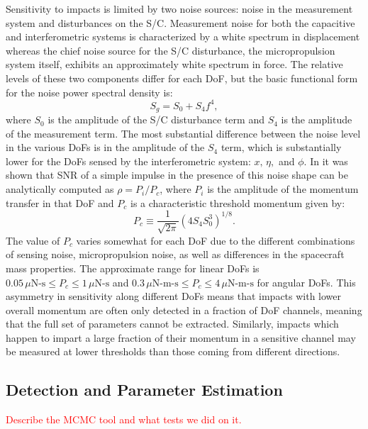 \documentclass[preprint, trackchanges]{aastex61}
\newcommand{\red}[1]{\textcolor{red}{#1}}
\begin{document}
Sensitivity to impacts is limited by two noise sources: noise in the measurement system and disturbances on the S/C.  Measurement noise for both the capacitive and interferometric systems is characterized by a white spectrum in displacement whereas the chief noise source for the S/C disturbance, the micropropulsion system itself, exhibits an approximately white spectrum in force.  The relative levels of these two components differ for each DoF, but the basic functional form for the noise power spectral density is:
\begin{equation}
S_{g}=S_0+S_4f^4,
\label{eq:noise}
\end{equation}
where $S_0$ is the amplitude of the S/C disturbance term and $S_4$ is the amplitude of the measurement term. The most substantial difference between the noise level in the various DoFs is in the amplitude of the $S_4$ term, which is substantially lower for the DoFs sensed by the interferometric system: $x,\,\eta,$ and $\phi$.  In \cite{Thorpe:2015cxa} it was shown that SNR of a simple impulse in the presence of this noise shape can be analytically computed as $\rho =  P_i/P_c$, where $P_i$ is the amplitude of the momentum transfer in that DoF and $P_c$ is a characteristic threshold momentum given by:
\begin{equation}
P_c \equiv \frac{1}{\sqrt{2\pi}}\left(4 S_4 S_0^3\right)^{1/8}.\label{eq:SNRp}
\end{equation} 
The value of $P_c$ varies somewhat for each DoF due to the different combinations of sensing noise, micropropulsion noise, as well as differences in the spacecraft mass properties. The approximate range for linear DoFs is $0.05\,\mu\textrm{N-s}\leq P_c \leq 1\,\mu\textrm{N-s}$ and $0.3\,\mu\textrm{N-m-s}\leq P_c \leq 4\,\mu\textrm{N-m-s}$ for angular DoFs. This asymmetry in sensitivity along different DoFs means that impacts with lower overall momentum are often only detected in a fraction of DoF channels, meaning that the full set of parameters cannot be extracted. Similarly, impacts which happen to impart a large fraction of their momentum in a sensitive channel may be measured at lower thresholds than those coming from different directions.

\FloatBarrier
\subsection{Detection and Parameter Estimation}\label{sec:MCMC}
\red{Describe the MCMC tool and what tests we did on it. }
\end{document}

